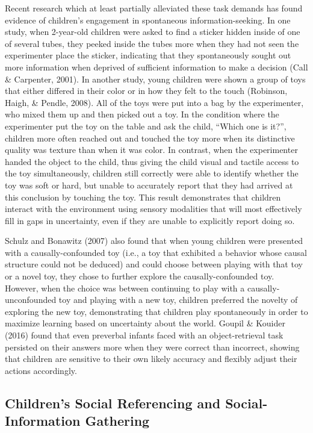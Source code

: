 \documentclass[floatsintext,man]{apa6}
\theoremstyle{definition}
\theoremstyle{definition}
\theoremstyle{definition}
\theoremstyle{remark}
\begin{document}
Recent research which at least partially alleviated these task demands
has found evidence of children's engagement in spontaneous
information-seeking. In one study, when 2-year-old children were asked
to find a sticker hidden inside of one of several tubes, they peeked
inside the tubes more when they had not seen the experimenter place the
sticker, indicating that they spontaneously sought out more information
when deprived of sufficient information to make a decision (Call \&
Carpenter, 2001). In another study, young children were shown a group of
toys that either differed in their color or in how they felt to the
touch (Robinson, Haigh, \& Pendle, 2008). All of the toys were put into
a bag by the experimenter, who mixed them up and then picked out a toy.
In the condition where the experimenter put the toy on the table and ask
the child, \enquote{Which one is it?}, children more often reached out
and touched the toy more when its distinctive quality was texture than
when it was color. In contrast, when the experimenter handed the object
to the child, thus giving the child visual and tactile access to the toy
simultaneously, children still correctly were able to identify whether
the toy was soft or hard, but unable to accurately report that they had
arrived at this conclusion by touching the toy. This result demonstrates
that children interact with the environment using sensory modalities
that will most effectively fill in gaps in uncertainty, even if they are
unable to explicitly report doing so.

Schulz and Bonawitz (2007) also found that when young children were
presented with a causally-confounded toy (i.e., a toy that exhibited a
behavior whose causal structure could not be deduced) and could choose
between playing with that toy or a novel toy, they chose to further
explore the causally-confounded toy. However, when the choice was
between continuing to play with a causally-unconfounded toy and playing
with a new toy, children preferred the novelty of exploring the new toy,
demonstrating that children play spontaneously in order to maximize
learning based on uncertainty about the world. Goupil \& Kouider (2016)
found that even preverbal infants faced with an object-retrieval task
persisted on their answers more when they were correct than incorrect,
showing that children are sensitive to their own likely accuracy and
flexibly adjust their actions accordingly.

\subsection{Children's Social Referencing and Social-Information
Gathering}\label{childrens-social-referencing-and-social-information-gathering}
\end{document}
